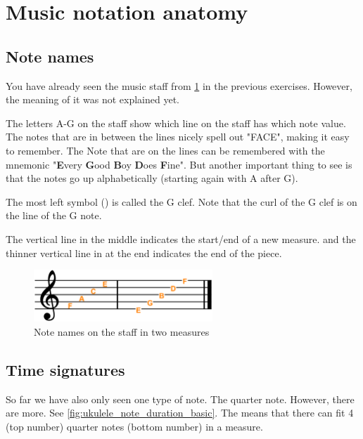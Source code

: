 \section{Music notation anatomy}

\subsection{Note names}

You have already seen the music staff from \ref{fig:ukulele_music_note_names_on_staff} in the previous exercises. However, the meaning of it was not explained yet.

The letters A-G on the staff show which line on the staff has which note value. The notes that are in between the lines nicely spell out "FACE", making it easy to remember. The Note that are on the lines can be remembered with the mnemonic "\textbf{E}very \textbf{G}ood \textbf{B}oy \textbf{D}oes \textbf{F}ine". But another important thing to see is that the notes go up alphabetically (starting again with A after G). 

The most left symbol (\clefG) is called the G clef. Note that the curl of the G clef is on the line of the G note. 

The vertical line in the middle indicates the start/end of a new measure. and the thinner vertical line in at the end indicates the end of the piece.

\begin{figure}[h]
	\centering
	\includegraphics[width=0.6\textwidth]{../Images/MusicNotation_MeasureNoteNames.png}
	\caption{Note names on the staff in two measures}
	\label{fig:ukulele_music_note_names_on_staff}
\end{figure}

\newpage

\subsection{Time signatures}

So far we have also only seen one type of note. The quarter note. However, there are more. See \ref{fig:ukulele_note_duration_basic}. The  means that there can fit 4 (top number) quarter notes (bottom number) in a measure. 


